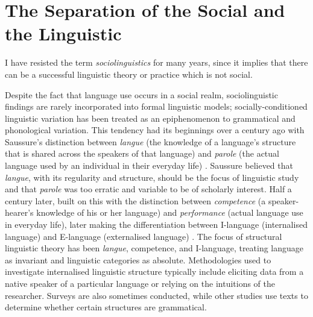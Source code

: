 \chapter{The Separation of the Social and the Linguistic}
\label{ch:intro}
\date{}

\epigraph{I have resisted the term \textit{sociolinguistics} for many years, since it implies that there can be a successful linguistic theory or practice which is not social.}{\cite[xix]{labov1972sociolingpatterns}}

\noindent Despite the fact that language use occurs in a social realm, sociolinguistic findings are rarely incorporated into formal linguistic models; socially-conditioned linguistic variation has been treated as an epiphenomenon to grammatical and phonological variation.  This tendency had its beginnings over a century ago with Saussure's distinction between \textit{langue} (the knowledge of a language's structure that is shared across the speakers of that language) and \textit{parole} (the actual language used by an individual in their everyday life) \cite{saussure1916}.  Saussure believed that \textit{langue}, with its regularity and structure, should be the focus of linguistic study and that \textit{parole} was too erratic and variable to be of scholarly interest.  Half a century later,  built on this with the distinction between  \textit{competence} (a speaker-hearer's knowledge of his or her language) and \textit{performance} (actual language use in everyday life), later making the differentiation between I-language (internalised language) and E-language (externalised language) \cite[20-22]{chomsky1986}.  The focus of structural linguistic theory has been \textit{langue}, competence, and I-language, treating language as invariant and linguistic categories as absolute.  Methodologies used to investigate internalised linguistic structure typically include eliciting data from a native speaker of a particular language or relying on the intuitions of the researcher.  Surveys are also sometimes conducted, while other studies use texts to determine whether certain structures are grammatical.  

